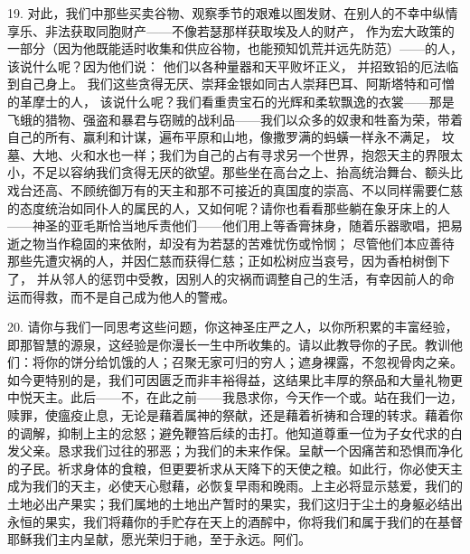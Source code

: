 19. 对此，我们中那些买卖谷物、观察季节的艰难以图发财、在别人的不幸中纵情享乐、非法获取同胞财产——不像若瑟那样获取埃及人的财产， 作为宏大政策的一部分（因为他既能适时收集和供应谷物，也能预知饥荒并远先防范）——的人，该说什么呢？因为他们说： 他们以各种量器和天平败坏正义， 并招致铅的厄法临到自己身上。 我们这些贪得无厌、崇拜金银如同古人崇拜巴耳、阿斯塔特和可憎的革摩士的人， 该说什么呢？我们看重贵宝石的光辉和柔软飘逸的衣裳——那是飞蛾的猎物、强盗和暴君与窃贼的战利品——我们以众多的奴隶和牲畜为荣，带着自己的所有、赢利和计谋，遍布平原和山地，像撒罗满的蚂蟥一样永不满足， 坟墓、大地、火和水也一样；我们为自己的占有寻求另一个世界，抱怨天主的界限太小，不足以容纳我们贪得无厌的欲望。那些坐在高台之上、抬高统治舞台、额头比戏台还高、不顾统御万有的天主和那不可接近的真国度的崇高、不以同样需要仁慈的态度统治如同仆人的属民的人，又如何呢？请你也看看那些躺在象牙床上的人——神圣的亚毛斯恰当地斥责他们——他们用上等香膏抹身，随着乐器歌唱，把易逝之物当作稳固的来依附，却没有为若瑟的苦难忧伤或怜悯； 尽管他们本应善待那些先遭灾祸的人，并因仁慈而获得仁慈；正如松树应当哀号，因为香柏树倒下了， 并从邻人的惩罚中受教，因别人的灾祸而调整自己的生活，有幸因前人的命运而得救，而不是自己成为他人的警戒。\par

20. 请你与我们一同思考这些问题，你这神圣庄严之人，以你所积累的丰富经验，即那智慧的源泉，这经验是你漫长一生中所收集的。请以此教导你的子民。教训他们：将你的饼分给饥饿的人；召聚无家可归的穷人；遮身裸露，不忽视骨肉之亲。 如今更特别的是，我们可因匮乏而非丰裕得益，这结果比丰厚的祭品和大量礼物更中悦天主。此后——不，在此之前——我恳求你，今天作一个或。站在我们一边，赎罪，使瘟疫止息，无论是藉着属神的祭献，还是藉着祈祷和合理的转求。藉着你的调解，抑制上主的忿怒；避免鞭笞后续的击打。他知道尊重一位为子女代求的白发父亲。恳求我们过往的邪恶；为我们的未来作保。呈献一个因痛苦和恐惧而净化的子民。祈求身体的食粮，但更要祈求从天降下的天使之粮。如此行，你必使天主成为我们的天主，必使天心慰藉，必恢复早雨和晚雨。上主必将显示慈爱，我们的土地必出产果实；我们属地的土地出产暂时的果实，我们这归于尘土的身躯必结出永恒的果实，我们将藉你的手贮存在天上的酒醡中，你将我们和属于我们的在基督耶稣我们主内呈献，愿光荣归于祂，至于永远。阿们。\par


